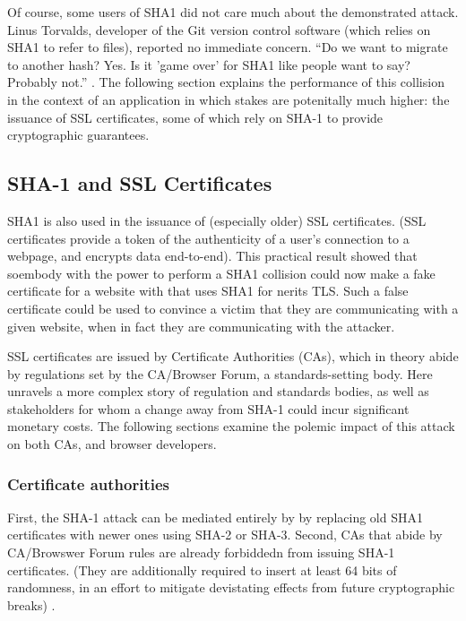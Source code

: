 \documentclass[sigconf]{acmart}
\begin{document}
Of course, some users of SHA1 did not care much about the demonstrated attack.
Linus Torvalds, developer of the Git version control software (which relies on SHA1 to refer to files), reported no immediate concern.
``Do we want to migrate to another hash? Yes. Is it 'game over' for SHA1 like people want to say? Probably not.'' \cite{Torvalds2017}.
The following section explains the performance of this collision in the context of 
an application in which stakes are potenitally much higher:
the issuance of SSL certificates, some of which rely on SHA-1 to provide cryptographic guarantees.

\subsection{SHA-1 and SSL Certificates}
\label{sec:orge63bf8f}

SHA1 is also used in the issuance of (especially older) SSL certificates.
(SSL certificates
provide a token of the authenticity of a user's connection to a webpage,
and encrypts data end-to-end).
This practical result showed that soembody with the power to perform a SHA1 collision could
now make a fake certificate for a website with that uses SHA1 for nerits TLS.
Such a false certificate could
be used to convince a victim that they are communicating with a given website,
when in fact they are communicating with the attacker.

SSL certificates are issued by Certificate Authorities (CAs), which in theory abide by 
regulations set by the CA/Browser Forum, a standards-setting body.
Here unravels a more complex story of regulation and standards bodies,
as well as stakeholders for whom a change away from SHA-1 could incur significant monetary costs.
The following sections examine the polemic impact of this attack on both CAs, and browser developers. 

\subsubsection{Certificate authorities}
\label{sec:org109f70c}

First, the SHA-1 attack can be mediated entirely by
by replacing old SHA1 certificates with newer ones using SHA-2 or SHA-3.
Second, CAs that abide by CA/Browswer Forum rules are already forbiddedn from issuing SHA-1 certificates. (They are additionally required to insert at least 64 bits of randomness, in an effort to mitigate devistating effects from future cryptographic breaks) \cite{Stevens2017}.
\end{document}
